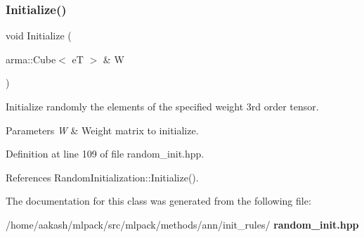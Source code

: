 \subsubsection{Initialize()\hspace{0.1cm}{\footnotesize\ttfamily [4/4]}}
{\footnotesize\ttfamily void Initialize (\begin{DoxyParamCaption}\item[{arma\+::\+Cube$<$ eT $>$ \&}]{W }\end{DoxyParamCaption})\hspace{0.3cm}{\ttfamily [inline]}}



Initialize randomly the elements of the specified weight 3rd order tensor. 


\begin{DoxyParams}{Parameters}
{\em W} & Weight matrix to initialize. \\
\hline
\end{DoxyParams}


Definition at line 109 of file random\+\_\+init.\+hpp.



References Random\+Initialization\+::\+Initialize().



The documentation for this class was generated from the following file\+:\begin{DoxyCompactItemize}
\item 
/home/aakash/mlpack/src/mlpack/methods/ann/init\+\_\+rules/\textbf{ random\+\_\+init.\+hpp}\end{DoxyCompactItemize}

